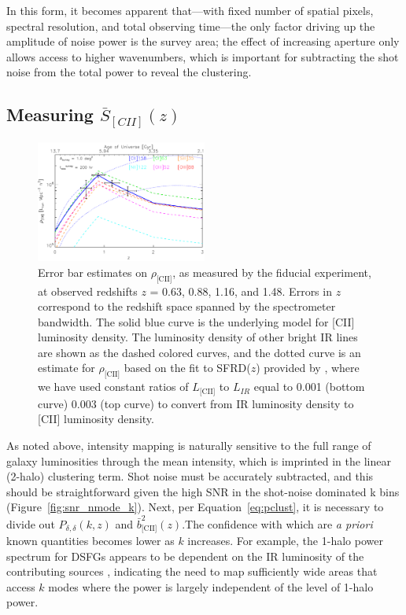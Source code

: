 \documentclass[iop]{emulateapj}
\begin{document}
In this form, it becomes apparent that---with fixed number of spatial pixels, spectral resolution, and total observing time---the only factor driving up the amplitude of noise power is the survey area; the effect of increasing aperture only allows access to higher wavenumbers, which is important for subtracting the shot noise from the total power to reveal the clustering.




\subsection{Measuring $\bar{S}_{[CII]}(z)$}

\begin{figure}[b]
\centering
\includegraphics[width=0.5\textwidth]{rhocii_vs_z_starfire_1sqdeg_tobs200hr_hb}
\caption{Error bar estimates on $\rho_{\textrm{[CII]}}$, as measured by the fiducial experiment, at observed redshifts $z$ = 0.63, 0.88, 1.16, and 1.48. Errors in $z$ correspond to the redshift space spanned by the spectrometer bandwidth. The solid blue curve is the underlying model for [CII] luminosity density. The luminosity density of other bright IR lines are shown as the dashed colored curves, and the dotted curve is an estimate for $\rho_{\textrm{[CII]}}$ based on the fit to SFRD($z$) provided by \citet{hb06}, where we have used constant ratios of $L_{\textrm{[CII]}}$ to $L_{IR}$ equal to 0.001 (bottom curve) 0.003 (top curve) to convert from IR luminosity density to [CII] luminosity density.}
\label{fig:scii_z}
\end{figure}

As noted above, intensity mapping is naturally sensitive to the full range of galaxy luminosities through the mean intensity, which is imprinted in the linear (2-halo) clustering term. Shot noise must be accurately subtracted, and this should be straightforward given the high SNR in the shot-noise dominated k bins (Figure~\ref{fig:snr_nmode_k}).  Next, per Equation~\ref{eq:pclust}, it is necessary to divide out $P_{\delta,\delta}(k,z)$ and  $\bar{b}_{\textrm{[CII]}}^2(z)$.The confidence with which are \emph{a priori} known quantities becomes lower as $k$ increases. For example, the 1-halo power spectrum for DSFGs appears to be dependent on the IR luminosity of the contributing sources \citep{viero13}, indicating the need to map sufficiently wide areas that access $k$ modes where the power is largely independent of the level of 1-halo power. 
\end{document}
